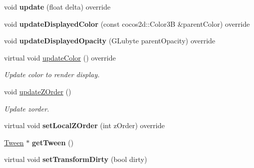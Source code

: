 \begin{DoxyCompactItemize}
\item 
\mbox{\label{classcocostudio_1_1Bone_a4c0132c6deee3de0e80b40fd7088a2c8}} 
void {\bfseries update} (float delta) override
\item 
\mbox{\label{classcocostudio_1_1Bone_a1e52dd16f8619ba33fba2c8e1a470a88}} 
void {\bfseries update\+Displayed\+Color} (const cocos2d\+::\+Color3B \&parent\+Color) override
\item 
\mbox{\label{classcocostudio_1_1Bone_a5354c795b957990240a750c9f252ab38}} 
void {\bfseries update\+Displayed\+Opacity} (G\+Lubyte parent\+Opacity) override
\item 
\mbox{\label{classcocostudio_1_1Bone_ac02bf197b6ee61518389c5741f4e578f}} 
virtual void \hyperlink{classcocostudio_1_1Bone_ac02bf197b6ee61518389c5741f4e578f}{update\+Color} () override
\begin{DoxyCompactList}\small\item\em Update color to render display. \end{DoxyCompactList}\item 
\mbox{\label{classcocostudio_1_1Bone_a49ca34fd1f032b8aca8106bd71754a6c}} 
void \hyperlink{classcocostudio_1_1Bone_a49ca34fd1f032b8aca8106bd71754a6c}{update\+Z\+Order} ()
\begin{DoxyCompactList}\small\item\em Update zorder. \end{DoxyCompactList}\item 
\mbox{\label{classcocostudio_1_1Bone_af200841eec29c8112c993a21131cc07b}} 
virtual void {\bfseries set\+Local\+Z\+Order} (int z\+Order) override
\item 
\mbox{\label{classcocostudio_1_1Bone_afb484ee8b3e7f9eace4a250616c4c519}} 
\hyperlink{classcocostudio_1_1Tween}{Tween} $\ast$ {\bfseries get\+Tween} ()
\item 
\mbox{\label{classcocostudio_1_1Bone_af52312eda5095ca8610de3776136b3a4}} 
virtual void {\bfseries set\+Transform\+Dirty} (bool dirty)
\item 

\end{DoxyCompactItemize}

